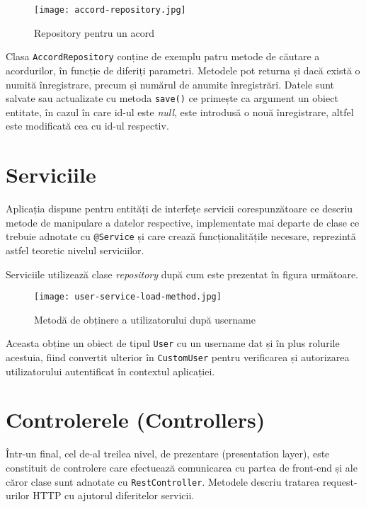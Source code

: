 \begin{figure}[H]
	\centering
	\texttt{[image: accord-repository.jpg]}
	\caption{Repository pentru un acord}
\end{figure}

Clasa \texttt{AccordRepository} conține de exemplu patru metode de căutare a acordurilor, în funcție de diferiți parametri. Metodele pot returna și dacă există o numită înregistrare, precum și numărul de anumite înregistrări. Datele sunt salvate sau actualizate cu metoda \texttt{save()} ce primește ca argument un obiect entitate, în cazul în care id-ul este \textit{null}, este introdusă o nouă înregistrare, altfel este modificată cea cu id-ul respectiv.

\section{Serviciile}

Aplicația dispune pentru entități de interfețe servicii corespunzătoare ce descriu metode de manipulare a datelor respective, implementate mai departe de clase ce trebuie adnotate cu \texttt{@Service} și care crează funcționalitățile necesare, reprezintă astfel teoretic nivelul serviciilor.

Serviciile utilizează clase \textit{repository} după cum este prezentat în figura următoare.

\begin{figure}[H]
	\centering
	\texttt{[image: user-service-load-method.jpg]}
	\caption{Metodă de obținere a utilizatorului după username}
\end{figure}

Aceasta obține un obiect de tipul \texttt{User} cu un username dat și în plus rolurile acestuia, fiind convertit ulterior în \texttt{CustomUser} pentru verificarea și autorizarea utilizatorului autentificat în contextul aplicației.

\section{Controlerele (Controllers)}

Într-un final, cel de-al treilea nivel, de prezentare (presentation layer), este constituit de controlere care efectuează comunicarea cu partea de front-end și ale căror clase sunt adnotate cu \texttt{RestController}. Metodele descriu tratarea request-urilor HTTP cu ajutorul diferitelor servicii.


